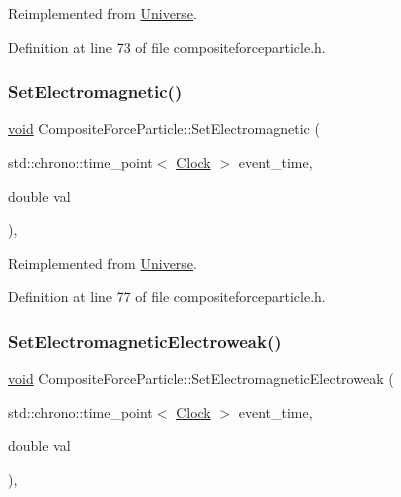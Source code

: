 Reimplemented from \mbox{\hyperlink{class_universe_aa22202ae740eb1355529afcb13285e91}{Universe}}.



Definition at line 73 of file compositeforceparticle.\+h.

\mbox{\label{class_composite_force_particle_a476c0d570c3be75c9e186df1ec2a5cda}} 
\subsubsection{\texorpdfstring{Set\+Electromagnetic()}{SetElectromagnetic()}}
{\footnotesize\ttfamily \mbox{\hyperlink{glad_8h_a950fc91edb4504f62f1c577bf4727c29}{void}} Composite\+Force\+Particle\+::\+Set\+Electromagnetic (\begin{DoxyParamCaption}\item[{std\+::chrono\+::time\+\_\+point$<$ \mbox{\hyperlink{universe_8h_a0ef8d951d1ca5ab3cfaf7ab4c7a6fd80}{Clock}} $>$}]{event\+\_\+time,  }\item[{double}]{val }\end{DoxyParamCaption})\hspace{0.3cm}{\ttfamily [inline]}, {\ttfamily [virtual]}}



Reimplemented from \mbox{\hyperlink{class_universe_aa981fc7e252b1fbbb675f0371860954d}{Universe}}.



Definition at line 77 of file compositeforceparticle.\+h.

\mbox{\label{class_composite_force_particle_ad53c5d396b3c56241174a9bd78f9e07a}} 
\subsubsection{\texorpdfstring{Set\+Electromagnetic\+Electroweak()}{SetElectromagneticElectroweak()}}
{\footnotesize\ttfamily \mbox{\hyperlink{glad_8h_a950fc91edb4504f62f1c577bf4727c29}{void}} Composite\+Force\+Particle\+::\+Set\+Electromagnetic\+Electroweak (\begin{DoxyParamCaption}\item[{std\+::chrono\+::time\+\_\+point$<$ \mbox{\hyperlink{universe_8h_a0ef8d951d1ca5ab3cfaf7ab4c7a6fd80}{Clock}} $>$}]{event\+\_\+time,  }\item[{double}]{val }\end{DoxyParamCaption})\hspace{0.3cm}{\ttfamily [inline]}, {\ttfamily [virtual]}}



